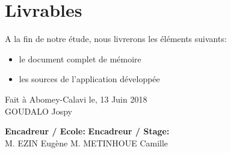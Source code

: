 \documentclass[a4paper,11pt]{article}
\begin{document}
\section{Livrables}
  A la fin de notre \'etude, nous livrerons les \'el\'ements suivants: 
  \begin{itemize}
    \item le document complet de mémoire
    \item les sources de l'application développée
  \end{itemize}

\vspace*{1cm}
  
  \flushright
    Fait \`a Abomey-Calavi le, 13 Juin 2018\\
\vspace*{1.5cm}
    GOUDALO Jospy
    
\vspace*{1cm}  
  \noindent \textbf{Encadreur / Ecole:} \hfill \textbf{Encadreur / Stage:} \\
\vspace*{1.5cm}
  \noindent M. EZIN Eug\`ene \hfill M. METINHOUE Camille
  
\end{document}
